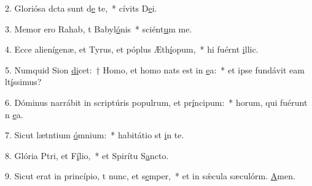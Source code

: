 2. Gloriósa dcta sunt d\uline{e} te,~* cívits D\uline{e}i.\par 
3. Memor ero Rahab, t Babyl\uline{ó}nis~* sciént\uline{u}m me.\par 
4. Ecce alienígenæ, et Tyrus, et póplus Æth\uline{í}opum,~* hi fuérnt \uline{i}llic.\par 
5. Numquid Sion \uline{di}cet:~† Homo, et homo nats est in \uline{e}a:~* et ipse fundávit eam lt\uline{í}ssimus?\par 
6. Dóminus narrábit in scriptúris populrum, et pr\uline{í}ncipum:~* horum, qui fuérunt n \uline{e}a.\par 
7. Sicut lætntium \uline{ó}mnium:~* habitátio st \uline{i}n te.\par 
8. Glória Ptri, et F\uline{í}lio,~* et Spirítu S\uline{a}ncto.\par 
9. Sicut erat in princípio, t nunc, et s\uline{e}mper,~* et in sǽcula sæculórm. \uline{A}men.\par 
